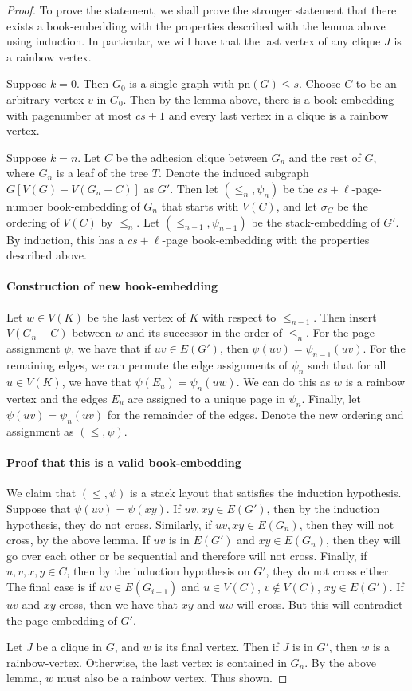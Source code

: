 \documentclass[]{report}
\newcommand{\pn}{\text{pn}}
\theoremstyle{definition}
\numberwithin{theorem}{section}
\numberwithin{equation}{section}
\begin{document}
\begin{proof}
	To prove the statement, we shall prove the stronger statement that there exists a book-embedding with the properties described with the lemma above using induction. In particular, we will have that the last vertex of any clique $J$ is a rainbow vertex.
	
	Suppose $k = 0$. Then $G_0$ is a single graph with $\pn(G) \leq s$. Choose $C$ to be an arbitrary vertex $v$ in $G_0$. Then by the lemma above, there is a book-embedding with pagenumber at most $cs + 1$ and every last vertex in a clique is a rainbow vertex.
	
	Suppose $k = n$. Let $C$ be the adhesion clique between $G_n$ and the rest of $G$, where $G_n$ is a leaf of the tree $T$. Denote the induced subgraph $G[V(G) - V(G_n - C)]$ as $G'$. Then let $(\leq_n, \psi_n)$ be the $cs + \ell$-page-number book-embedding of $G_n$ that starts with $V(C)$, and let $\sigma_C$ be the ordering of $V(C)$ by $\leq_n$. Let $(\leq_{n-1}, \psi_{n-1})$ be the stack-embedding of $G'$. By induction, this has a $cs + \ell$-page book-embedding with the properties described above.
	
	\paragraph{Construction of new book-embedding}
	Let $w \in V(K)$ be the last vertex of $K$ with respect to $\leq_{n-1}$. Then insert $V(G_n - C)$ between $w$ and its successor in the order of $\leq_{n}$. For the page assignment $\psi$, we have that if $uv \in E(G')$, then $\psi(uv) = \psi_{n-1}(uv)$. For the remaining edges, we can permute the edge assignments of $\psi_n$ such that for all $u \in V(K)$, we have that $\psi(E_u) = \psi_n(uw)$. We can do this as $w$ is a rainbow vertex and the edges $E_u$ are assigned to a unique page in $\psi_n$. Finally, let $\psi(uv) = \psi_n(uv)$ for the remainder of the edges. Denote the new ordering and assignment as $(\leq, \psi)$. 
	\paragraph{Proof that this is a valid book-embedding}
	We claim that $(\leq , \psi)$ is a stack layout that satisfies the induction hypothesis. Suppose that $\psi(uv) = \psi(xy)$. If $uv, xy \in E(G')$, then by the induction hypothesis, they do not cross. Similarly, if $uv, xy \in E(G_n)$, then they will not cross, by the above lemma. If $uv$ is in $E(G')$ and $xy \in E(G_n)$, then they will go over each other or be sequential and therefore will not cross. 
	Finally, if $u, v, x, y \in C$, then by the induction hypothesis on $G'$, they do not cross either. The final case is if $uv \in E(G_{i + 1})$ and $u \in V(C)$, $v \notin V(C)$, $xy \in E(G')$. If $uv$ and $xy$ cross, then we have that $xy$ and $uw$ will cross. But this will contradict the page-embedding of $G'$.
	
	Let $J$ be a clique in $G$, and $w$ is its final vertex. Then if $J$ is in $G'$, then $w$ is a rainbow-vertex. Otherwise, the last vertex is contained in $G_n$. By the above lemma, $w$ must also be a rainbow vertex. Thus shown.
\end{proof}
\end{document}
